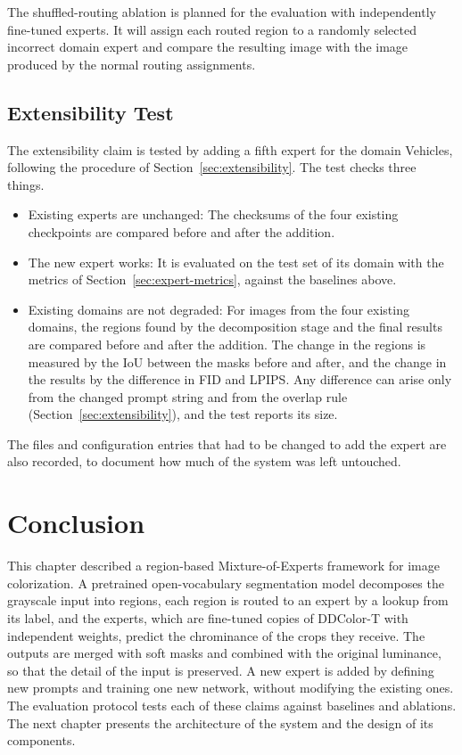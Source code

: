 \documentclass{FastFyp}
\begin{document}
The shuffled-routing ablation is planned for the evaluation with
independently fine-tuned experts. It will assign each routed region to
a randomly selected incorrect domain expert and compare the resulting
image with the image produced by the normal routing assignments.

\subsection{Extensibility Test}

The extensibility claim is tested by adding a fifth expert for the domain Vehicles, following the procedure of Section~\ref{sec:extensibility}. The test checks three things.

\begin{itemize}
    \item Existing experts are unchanged: The checksums of the four existing checkpoints are compared before and after the addition.
    \item The new expert works: It is evaluated on the test set of its domain with the metrics of Section~\ref{sec:expert-metrics}, against the baselines above.
    \item Existing domains are not degraded: For images from the four existing domains, the regions found by the decomposition stage and the final results are compared before and after the addition. The change in the regions is measured by the IoU between the masks before and after, and the change in the results by the difference in FID and LPIPS. Any difference can arise only from the changed prompt string and from the overlap rule (Section~\ref{sec:extensibility}), and the test reports its size.
\end{itemize}

The files and configuration entries that had to be changed to add the expert are also recorded, to document how much of the system was left untouched.

\section*{Conclusion}

This chapter described a region-based Mixture-of-Experts framework for image colorization. A pretrained open-vocabulary segmentation model decomposes the grayscale input into regions, each region is routed to an expert by a lookup from its label, and the experts, which are fine-tuned copies of DDColor-T with independent weights, predict the chrominance of the crops they receive. The outputs are merged with soft masks and combined with the original luminance, so that the detail of the input is preserved. A new expert is added by defining new prompts and training one new network, without modifying the existing ones. The evaluation protocol tests each of these claims against baselines and ablations. The next chapter presents the architecture of the system and the design of its components.
\end{document}
